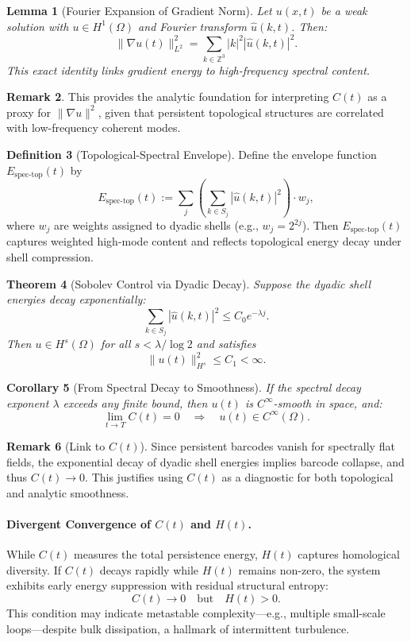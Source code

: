 \documentclass[11pt]{article}
\newtheorem{theorem}{Theorem}[section]
\newtheorem{lemma}[theorem]{Lemma}
\newtheorem{corollary}[theorem]{Corollary}
\theoremstyle{definition}
\newtheorem{definition}[theorem]{Definition}
\newtheorem{remark}[theorem]{Remark}
\begin{document}
\begin{lemma}[Fourier Expansion of Gradient Norm]
Let $u(x,t)$ be a weak solution with $u \in H^1(\Omega)$ and Fourier transform $\hat{u}(k,t)$. Then:
\[
\|\nabla u(t)\|_{L^2}^2 = \sum_{k \in \mathbb{Z}^3} |k|^2 |\hat{u}(k,t)|^2.
\]
This exact identity links gradient energy to high-frequency spectral content.
\end{lemma}

\begin{remark}
This provides the analytic foundation for interpreting $C(t)$ as a proxy for $\|\nabla u\|^2$, given that persistent topological structures are correlated with low-frequency coherent modes.
\end{remark}

\begin{definition}[Topological-Spectral Envelope]
Define the envelope function $E_{\text{spec-top}}(t)$ by
\[
E_{\text{spec-top}}(t) := \sum_j \left( \sum_{k \in S_j} |\hat{u}(k,t)|^2 \right) \cdot w_j,
\]
where $w_j$ are weights assigned to dyadic shells (e.g., $w_j = 2^{2j}$). Then $E_{\text{spec-top}}(t)$ captures weighted high-mode content and reflects topological energy decay under shell compression.
\end{definition}

\begin{theorem}[Sobolev Control via Dyadic Decay]
Suppose the dyadic shell energies decay exponentially:
\[
\sum_{k \in S_j} |\hat{u}(k,t)|^2 \leq C_0 e^{-\lambda j}.
\]
Then $u \in H^s(\Omega)$ for all $s < \lambda / \log 2$ and satisfies
\[
\|u(t)\|_{H^s}^2 \leq C_1 < \infty.
\]
\end{theorem}

\begin{corollary}[From Spectral Decay to Smoothness]
If the spectral decay exponent $\lambda$ exceeds any finite bound, then $u(t)$ is $C^\infty$-smooth in space, and:
\[
\lim_{t \to T} C(t) = 0 \quad \Rightarrow \quad u(t) \in C^\infty(\Omega).
\]
\end{corollary}

\begin{remark}[Link to $C(t)$]
Since persistent barcodes vanish for spectrally flat fields, the exponential decay of dyadic shell energies implies barcode collapse, and thus $C(t) \to 0$. This justifies using $C(t)$ as a diagnostic for both topological and analytic smoothness.
\end{remark}

\paragraph{Divergent Convergence of $C(t)$ and $H(t)$.}
While $C(t)$ measures the total persistence energy, $H(t)$ captures homological diversity.  
If $C(t)$ decays rapidly while $H(t)$ remains non-zero, the system exhibits early energy suppression with residual structural entropy:
\[
C(t) \to 0 \quad \text{but} \quad H(t) > 0.
\]
This condition may indicate metastable complexity—e.g., multiple small-scale loops—despite bulk dissipation, a hallmark of intermittent turbulence.
\end{document}
